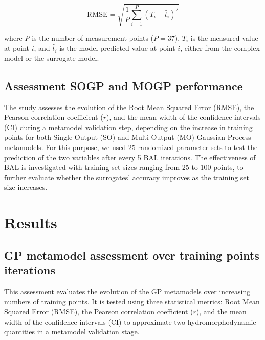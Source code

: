 \documentclass[draft,linenumbers,onecolumn]{agujournal2019} %
\begin{document}
\begin{equation}
	\text{RMSE} = \sqrt{ \frac{1}{P} \sum_{i=1}^{P} (T_i - \hat{t}_i)^2 }
\end{equation}

where \( P \) is the number of measurement points (\( P = 37 \)), \( T_i \) is the measured value at point \( i \), and \( \hat{t}_i \) is the model-predicted value at point \( i \), either from the complex model or the surrogate model.



\subsection{Assessment SOGP and MOGP performance}
\label{sec:sec2.8}
The study assesses the evolution of the Root Mean Squared Error (RMSE), the Pearson correlation coefficient (\(r\)), and the mean width of the confidence intervals (CI) during a metamodel validation step, depending on the increase in training points for both Single-Output (SO) and Multi-Output (MO) Gaussian Process metamodels. For this purpose, we used 25 randomized parameter sets to test the prediction of the two variables after every 5 BAL iterations. The effectiveness of BAL is investigated with training set sizes ranging from 25 to 100 points, to further evaluate whether the surrogates' accuracy improves as the training set size increases.

\section{Results}

\subsection{GP metamodel assessment over training points iterations}

This assessment evaluates the evolution of the GP metamodels over increasing numbers of training points. It is tested using three statistical metrics: Root Mean Squared Error (RMSE), the Pearson correlation coefficient (\(r\)), and the mean width of the confidence intervals (CI) to approximate two hydromorphodynamic quantities in a metamodel validation stage. 
\end{document}
